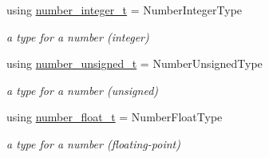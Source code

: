 \begin{DoxyCompactItemize}
$$using \hyperlink{classnlohmann_1_1basic__json_a98e611d67b7bd75307de99c9358ab2dc}{number\+\_\+integer\+\_\+t} = Number\+Integer\+Type
\begin{DoxyCompactList}\small\item\em a type for a number (integer) \end{DoxyCompactList}\item 
using \hyperlink{classnlohmann_1_1basic__json_ab906e29b5d83ac162e823ada2156b989}{number\+\_\+unsigned\+\_\+t} = Number\+Unsigned\+Type
\begin{DoxyCompactList}\small\item\em a type for a number (unsigned) \end{DoxyCompactList}\item 
using \hyperlink{classnlohmann_1_1basic__json_a88d6103cb3620410b35200ee8e313d97}{number\+\_\+float\+\_\+t} = Number\+Float\+Type
\begin{DoxyCompactList}\small\item\em a type for a number (floating-\/point) \end{DoxyCompactList}\end{DoxyCompactItemize}
